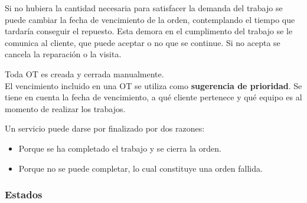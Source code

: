 \documentclass[12pt]{extarticle}
\begin{document}
\begin{spacing}{1.2}
    Si no hubiera la cantidad necesaria para satisfacer la demanda del trabajo se puede cambiar la fecha de vencimiento de la orden, contemplando el tiempo que tardaría conseguir el repuesto. Esta demora en el cumplimento del trabajo se le comunica al cliente, que puede aceptar o no que se continue. Si no acepta se cancela la reparación o la visita.

    Toda OT es creada y cerrada manualmente.\\

    El vencimiento incluido en una OT se utiliza como \textbf{sugerencia de prioridad}. Se tiene en cuenta la fecha de vencimiento, a qué cliente pertenece y qué equipo es al momento de realizar los trabajos. 

    Un servicio puede darse por finalizado por dos razones:
    \begin{itemize}
        \item Porque se ha completado el trabajo y se cierra la orden.
        \item Porque no se puede completar, lo cual constituye una orden fallida.
    \end{itemize}

    \subsubsection{Estados}


\end{spacing}
\end{document}
